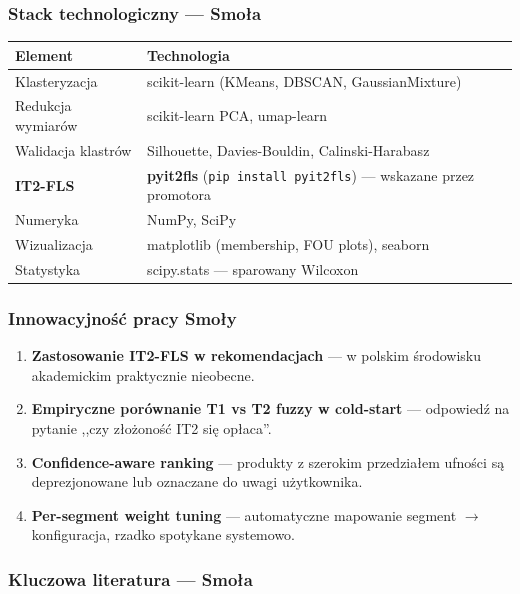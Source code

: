 \documentclass[a4paper,11pt]{article}
\newcommand{\code}[1]{\texttt{\small #1}}
\begin{document}
\subsubsection*{Stack technologiczny --- Smoła}

\begin{table}[H]
\centering
\small
\begin{tabularx}{\textwidth}{l Y}
\toprule
\textbf{Element} & \textbf{Technologia} \\
\midrule
Klasteryzacja & scikit-learn (KMeans, DBSCAN, GaussianMixture) \\
Redukcja wymiarów & scikit-learn PCA, umap-learn \\
Walidacja klastrów & Silhouette, Davies-Bouldin, Calinski-Harabasz \\
\textbf{IT2-FLS} & \textbf{pyit2fls} (\code{pip install pyit2fls}) --- wskazane przez promotora \\
Numeryka & NumPy, SciPy \\
Wizualizacja & matplotlib (membership, FOU plots), seaborn \\
Statystyka & scipy.stats --- sparowany Wilcoxon \\
\bottomrule
\end{tabularx}
\end{table}

\subsubsection*{Innowacyjność pracy Smoły}

\begin{enumerate}[leftmargin=1.5em,itemsep=2pt]
  \item \textbf{Zastosowanie IT2-FLS w rekomendacjach} --- w polskim środowisku akademickim praktycznie nieobecne.
  \item \textbf{Empiryczne porównanie T1 vs T2 fuzzy w cold-start} --- odpowiedź na pytanie ,,czy złożoność IT2 się opłaca''.
  \item \textbf{Confidence-aware ranking} --- produkty z szerokim przedziałem ufności są deprezjonowane lub oznaczane do uwagi użytkownika.
  \item \textbf{Per-segment weight tuning} --- automatyczne mapowanie segment $\to$ konfiguracja, rzadko spotykane systemowo.
\end{enumerate}

\subsubsection*{Kluczowa literatura --- Smoła}
\end{document}

